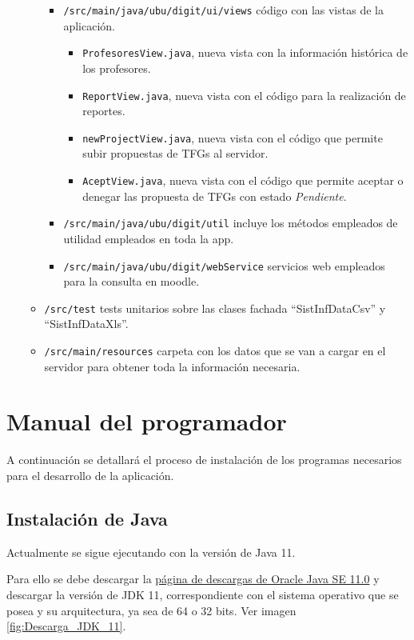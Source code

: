 \begin{itemize}
\begin{itemize}
\begin{itemize}
				\item \texttt{/src/main/java/ubu/digit/ui/views} código con las vistas de la aplicación.
					\begin{itemize}
						\item \texttt{ProfesoresView.java}, nueva vista con la información histórica de los profesores.
						\item \texttt{ReportView.java}, nueva vista con el código para la realización de reportes.
						\item \texttt{newProjectView.java}, nueva vista con el código que permite subir propuestas de TFGs al servidor.
						\item \texttt{AceptView.java}, nueva vista con el código que permite aceptar o denegar las propuesta de TFGs con estado \emph{Pendiente}.
					\end{itemize}
				\item \texttt{/src/main/java/ubu/digit/util} incluye los métodos empleados de utilidad empleados en toda la app. 
				\item \texttt{/src/main/java/ubu/digit/webService} servicios web empleados para la consulta en moodle.
			\end{itemize}
			
			\item \texttt{/src/test} tests unitarios sobre las clases fachada “SistInfDataCsv” y “SistInfDataXls”.
			
			\item \texttt{/src/main/resources} carpeta con los datos que se van a cargar en el servidor para obtener toda la información necesaria.
		\end{itemize}
	
\end{itemize}
			
\section{Manual del programador}

A continuación se detallará el proceso de instalación de los programas
necesarios para el desarrollo de la aplicación.

\subsection{Instalación de Java}

Actualmente se sigue ejecutando con la versión de Java 11.

Para ello se debe descargar la \href{https://www.oracle.com/es/java/technologies/javase/jdk11-archive-downloads.html}{página de descargas de Oracle Java SE 11.0} y descargar la versión de JDK 11, correspondiente con el sistema operativo que se posea y su arquitectura, ya sea de 64 o 32 bits. Ver imagen \ref{fig:Descarga_JDK_11}.

